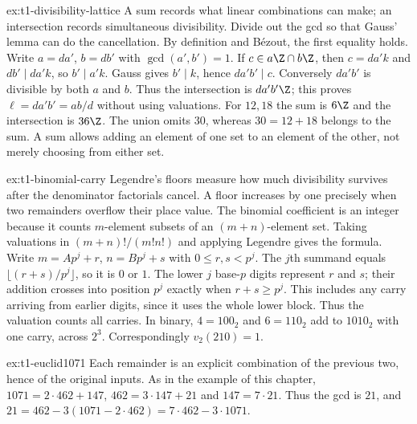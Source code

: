 \begin{solution}{ex:t1-divisibility-lattice}
\idea A sum records what linear combinations can make; an intersection records simultaneous divisibility. Divide out the gcd so that Gauss' lemma can do the cancellation.
\writeup By definition and B\'ezout, the first equality holds. Write $a=da'$, $b=db'$ with $\gcd(a',b')=1$. If $c\in a\Z\cap b\Z$, then $c=da'k$ and $db'\mid da'k$, so $b'\mid a'k$. Gauss gives $b'\mid k$, hence $da'b'\mid c$. Conversely $da'b'$ is divisible by both $a$ and $b$. Thus the intersection is $da'b'\Z$; this proves $\ell=da'b'=ab/d$ without using valuations. For $12,18$ the sum is $6\Z$ and the intersection is $36\Z$. The union omits $30$, whereas $30=12+18$ belongs to the sum. A sum allows adding an element of one set to an element of the other, not merely choosing from either set.
\end{solution}

\begin{solution}{ex:t1-binomial-carry}
\idea Legendre's floors measure how much divisibility survives after the denominator factorials cancel. A floor increases by one precisely when two remainders overflow their place value.
\writeup The binomial coefficient is an integer because it counts $m$-element subsets of an $(m+n)$-element set. Taking valuations in $(m+n)!/(m!n!)$ and applying Legendre gives the formula. Write $m=Ap^j+r$, $n=Bp^j+s$ with $0\le r,s<p^j$. The $j$th summand equals $\lfloor(r+s)/p^j\rfloor$, so it is $0$ or $1$. The lower $j$ base-$p$ digits represent $r$ and $s$; their addition crosses into position $p^j$ exactly when $r+s\ge p^j$. This includes any carry arriving from earlier digits, since it uses the whole lower block. Thus the valuation counts all carries. In binary, $4=100_2$ and $6=110_2$ add to $1010_2$ with one carry, across $2^3$. Correspondingly $v_2(210)=1$.
\end{solution}

\begin{solution}{ex:t1-euclid1071}
\idea Each remainder is an explicit combination of the previous two, hence of the original inputs.
\writeup As in the example of this chapter, $1071=2\cdot 462+147$, $462=3\cdot 147+21$ and $147=7\cdot 21$. Thus the gcd is $21$, and $21=462-3(1071-2\cdot 462)=7\cdot 462-3\cdot 1071$.
\end{solution}

